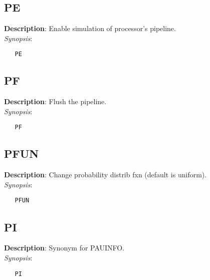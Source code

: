 \subsection{\bf PE}
\label{manpages:PE}
\label{manpages:pe}
\vspace{-0.2in}
{\bf Description}: 	Enable simulation of processor's pipeline.\\[1.5ex]
{\em Synopsis}:
\vspace{-0.2in}
\scriptsize
\begin{verbatim}
   PE   				
\end{verbatim}
\normalsize
\vspace{-0.2in}


\subsection{\bf PF}
\label{manpages:PF}
\label{manpages:pf}
\vspace{-0.2in}
{\bf Description}: 	Flush the pipeline.\\[1.5ex]
{\em Synopsis}:
\vspace{-0.2in}
\scriptsize
\begin{verbatim}
   PF   						
\end{verbatim}
\normalsize
\vspace{-0.2in}


\subsection{\bf PFUN}
\label{manpages:PFUN}
\label{manpages:pfun}
\vspace{-0.2in}
{\bf Description}: 	Change probability distrib fxn (default is uniform).\\[1.5ex]
{\em Synopsis}:
\vspace{-0.2in}
\scriptsize
\begin{verbatim}
   PFUN   		
\end{verbatim}
\normalsize
\vspace{-0.2in}


\subsection{\bf PI}
\label{manpages:PI}
\label{manpages:pi}
\vspace{-0.2in}
{\bf Description}: 	Synonym for PAUINFO.\\[1.5ex]
{\em Synopsis}:
\vspace{-0.2in}
\scriptsize
\begin{verbatim}
   PI   						
\end{verbatim}
\normalsize
\vspace{-0.2in}


